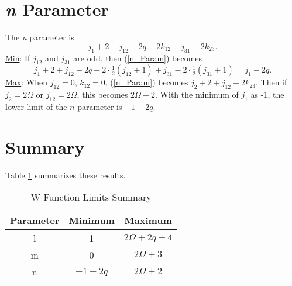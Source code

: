 \documentclass[main.tex]{subfiles}
\begin{document}
\section{\emph{n} Parameter}
The \emph{n} parameter is
\begin{equation}
	\label{n_Param}j_1 + 2 + j_{12} - 2 q - 2 k_{12} + j_{31} - 2 k_{23}.
\end{equation}
\underline{Min}: If $j_{12}$ and $j_{31}$ are odd, then (\ref{n_Param}) becomes
	\[j_1 + 2 + j_{12} - 2q - 2\cdot\tfrac{1}{2}(j_{12}+1) + j_{31} - 2\cdot\tfrac{1}{2}(j_{31}+1) = j_1 - 2q.\]
\underline{Max}: When $j_{12} = 0$, $k_{12} = 0$, (\ref{n_Param}) becomes $j_2 + 2 + j_{12} + 2k_{23}$.  Then if $j_2 = 2\Omega$ or $j_{12} = 2\Omega$, this becomes $2\Omega + 2$.  With the minimum of $j_1$ as -1, the lower limit of the $n$ parameter is $-1 - 2q$.

\section{Summary}
Table \ref{tab:WLimits} summarizes these results.

\begin{table}[H]
\begin{center}
\begin{tabular}{| c | c | c |}
  \hline
  Parameter & Minimum & Maximum \\
  \hline
  l & 1 & $2\Omega + 2q + 4$ \\
  m & 0 & $2\Omega + 3$ \\
  n	& $-1 - 2q$ & $2\Omega + 2$ \\
  \hline
\end{tabular}
\caption{W Function Limits Summary}
\label{tab:WLimits}
\end{center}
\end{table}
\end{document}
